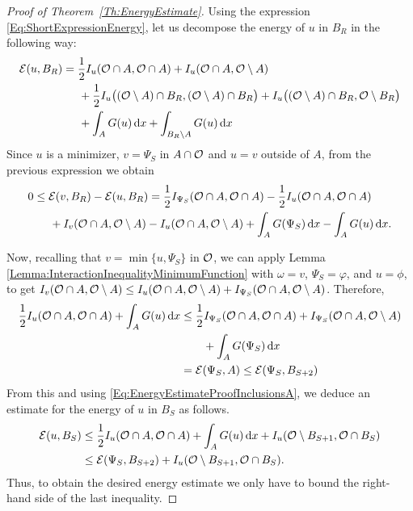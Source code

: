 \begin{proof}[Proof of Theorem~\ref{Th:EnergyEstimate}]
Using the expression \eqref{Eq:ShortExpressionEnergy}, let us decompose the energy of $u$ in $B_R$ in the following way:
\begin{align*}
\mathcal{E}(u,B_R) &= \frac{1}{2}I_u(\mathcal{O} \cap A, \mathcal{O} \cap A) + I_u(\mathcal{O} \cap A, \mathcal{O} \setminus A) \\
& \hspace{5mm} + \frac{1}{2}I_u\big((\mathcal{O} \setminus A) \cap B_R, (\mathcal{O} \setminus A) \cap B_R\big) + I_u\big((\mathcal{O} \setminus A) \cap B_R, \mathcal{O} \setminus B_R\big) \\
& \hspace{5mm} + \int_A G(u) \,\mathrm{d} x + \int_{B_R\setminus A} G(u) \,\mathrm{d} x
\end{align*}
Since $u$ is a minimizer, $v=\Psi_S$ in $A\cap \mathcal{O}$ and $u=v$ outside of $A$,  from the previous expression we obtain
\begin{align*}
0 &\leq \mathcal{E}(v,B_R)-\mathcal{E}(u,B_R) = \frac{1}{2}I_{\Psi_S}(\mathcal{O} \cap A, \mathcal{O} \cap A) - \frac{1}{2}I_u(\mathcal{O} \cap A, \mathcal{O} \cap A)\\
& \hspace{5mm} + I_v(\mathcal{O} \cap A, \mathcal{O} \setminus A) - I_u(\mathcal{O} \cap A, \mathcal{O} \setminus A) + \int_A G(\Psi_S) \,\mathrm{d} x - \int_{A} G(u) \,\mathrm{d} x.
\end{align*}

Now, recalling that $v = \min\{u,\Psi_S\}$ in $\mathcal{O}$, we can apply Lemma \ref{Lemma:InteractionInequalityMinimumFunction} with $\omega = v$, $\Psi_S = \varphi$, and $u= \phi$, to get $I_v(\mathcal{O} \cap A, \mathcal{O}\setminus A) \leq I_u(\mathcal{O} \cap A, \mathcal{O}\setminus A) + I_{\Psi_S}(\mathcal{O} \cap A, \mathcal{O}\setminus A)$. Therefore,
\begin{align*}
\frac{1}{2}I_u(\mathcal{O} \cap A, \mathcal{O} \cap A) + \int_{A} G(u) \,\mathrm{d} x &\leq \frac{1}{2}I_{\Psi_S}(\mathcal{O} \cap A, \mathcal{O} \cap A) + I_{\Psi_S}(\mathcal{O} \cap A, \mathcal{O} \setminus A) \\
& \quad \quad  + \int_A G(\Psi_S)  \,\mathrm{d} x \\
&= \mathcal{E}(\Psi_S, A) \leq \mathcal{E}(\Psi_S,B_{S+2})
\end{align*}
From this and using \eqref{Eq:EnergyEstimateProofInclusionsA}, we deduce an estimate for the energy of $u$ in $B_S$ as follows.
\begin{align*}
\mathcal{E}(u,B_S) &\leq \frac{1}{2}I_u(\mathcal{O} \cap A, \mathcal{O} \cap A) + \int_{A} G(u) \,\mathrm{d} x + I_u(\mathcal{O} \setminus B_{S+1}, \mathcal{O} \cap B_S) \\
& \leq  \mathcal{E}(\Psi_S,B_{S+2}) + I_u(\mathcal{O} \setminus B_{S+1}, \mathcal{O} \cap B_S).
\end{align*}
Thus, to obtain the desired energy estimate we only have to bound the right-hand side of the last inequality.



\end{proof}
